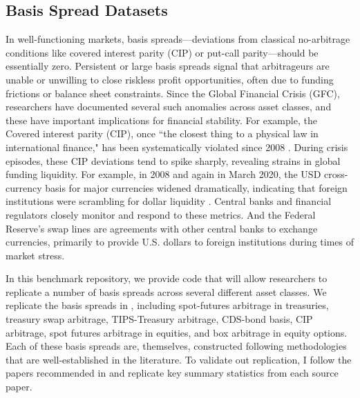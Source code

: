 \documentclass{article}
\begin{document}
\subsection{Basis Spread Datasets}

In well-functioning markets, basis spreads---deviations from classical no-arbitrage conditions like covered interest parity (CIP) or put-call parity---should be essentially zero. Persistent or large basis spreads signal that arbitrageurs are unable or unwilling to close riskless profit opportunities, often due to funding frictions or balance sheet constraints. Since the Global Financial Crisis (GFC), researchers have documented several such anomalies across asset classes, and these have important implications for financial stability.
For example, the Covered interest parity (CIP), once ``the closest thing to a physical law in international finance," has been systematically violated since 2008 \cite{Du2018}.
During crisis episodes, these CIP deviations tend to spike sharply, revealing strains in global funding liquidity. For example, in 2008 and again in March 2020, the USD cross-currency basis for major currencies widened dramatically, indicating that foreign institutions were scrambling for dollar liquidity 
\citep{BoardofGovernorsoftheFederalReserveSystem2020}.
Central banks and financial regulators closely monitor and respond to these metrics.
And the Federal Reserve's swap lines are agreements with other central banks to exchange currencies, primarily to provide U.S. dollars to foreign institutions during times of market stress.

In this benchmark repository, we provide code that will allow researchers to replicate a number of basis spreads across several different asset classes. We replicate the basis spreads in \cite{Siriwardane2021}, including spot-futures arbitrage in treasuries, treasury swap arbitrage, TIPS-Treasury arbitrage, CDS-bond basis, CIP arbitrage, spot futures arbitrage in equities, and box arbitrage in equity options.
Each of these basis spreads are, themselves, constructed following methodologies that are well-established in the literature. To validate out replication, I follow the papers recommended in \cite{Siriwardane2021} and replicate key summary statistics from each source paper.



\end{document}

